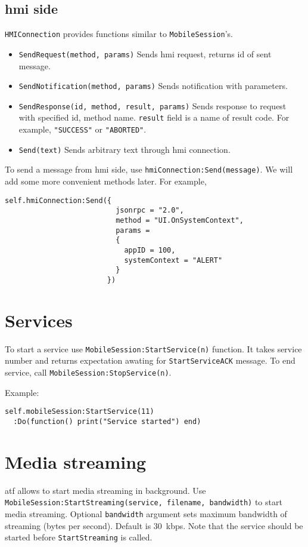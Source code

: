 \documentclass{article}
\begin{document}
\subsection{{\sc hmi} side}
{\tt HMIConnection} provides functions similar to {\tt MobileSession}'s.
\begin{itemize}
  \item {\tt SendRequest(method, params)} Sends {\sc hmi} request, returns id of sent message.
  \item {\tt SendNotification(method, params)} Sends notification with parameters.
  \item {\tt SendResponse(id, method, result, params)} Sends response to request with specified
  id, method name. {\tt result} field is a name of result code.
  For example, {\tt "SUCCESS"} or {\tt "ABORTED"}.
  \item {\tt Send(text)} Sends arbitrary text through {\sc hmi} connection.
\end{itemize}
To send a message from {\sc hmi} side, use {\tt hmiConnection:Send(message)}.
We will add some more convenient methods later.
For example,
\begin{lstlisting}
self.hmiConnection:Send({
                          jsonrpc = "2.0",
                          method = "UI.OnSystemContext",
                          params =
                          {
                            appID = 100,
                            systemContext = "ALERT"
                          }
                        })
\end{lstlisting}

\section{Services}
To start a service use {\tt MobileSession:StartService(n)} function.
It takes service number and returns expectation awating for
{\tt StartServiceACK} message.
To end service, call {\tt MobileSession:StopService(n)}.

Example:
\begin{lstlisting}
self.mobileSession:StartService(11)
  :Do(function() print("Service started") end)
\end{lstlisting}

\section{Media streaming}
{\sc atf} allows to start media streaming in background.
Use {\tt MobileSession:StartStreaming(service, filename, bandwidth)} to start media streaming.
Optional {\tt bandwidth} argument sets maximum bandwidth of streaming (bytes per second).
Default is 30~kbps.
Note that the service should be started before {\tt StartStreaming} is called.
\end{document}
